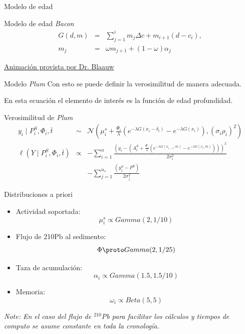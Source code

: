 \documentclass{beamer}
\begin{document}
\begin{frame}{Modelo de edad}
	\begin{block}{Modelo de edad \textit{Bacon} }
 		\begin{eqnarray}
			G(d,m) &=& \sum_{j=1}^i m_j \Delta c  + m_{i+1} (d-c_i)   , \nonumber \\
			m_j &=& \omega m_{j+1}+(1-\omega)\alpha_j \nonumber
		\end{eqnarray}
	\end{block} 
	\href{https://chrono.qub.ac.uk/blaauw/wiggles/Bayes.gif}{Animación provista por Dr. Blaauw}
\end{frame} 

\begin{frame}{Modelo \textit{Plum}}
	Con esto se puede definir la verosimilitud de manera adecuada.

	En esta ecuación el elemento de interés es la función de edad profundidad.
	\begin{block}{ Verosimilitud de \textit{Plum}}
 		\begin{eqnarray}
			y_i\mid P^S_i, \Phi_i, \bar{t} &\sim& \mathcal{N} \left(\mu^s_i+\frac{\Phi_i}{\lambda} \left( e^{-\lambda G(x_i-\delta_i)} - e^{-\lambda G(x_i)} \right), (\sigma_i\rho_i)^2 \right) \nonumber \\
			\ell(Y \mid P^S_i, \Phi_i, \bar{t}  ) &\propto&  -\sum_{i=1}^n \frac{\left(y_i-\left(A_i^S+ \frac{\Phi_i}{\lambda}\left( e^{-\lambda G(x_{i-1},m)} - e^{-\lambda G(x_{i},m)}\right) \right)\right)^2}{2\sigma_i^2} \nonumber \\
			& & - \sum_{j=1}^{n_s} \frac{(y_j^S-P^S)}{2\sigma_j^2} \nonumber
		\end{eqnarray}
	\end{block} 
	\end{frame} 



\begin{frame}{Distribuciones a priori }	
	\begin{block}{ }
 		\begin{itemize}
			\item{Actividad soportada: $$\mu_i^s \propto Gamma(2,1/10)$$ }
			\item{Flujo de 210Pb al sedimento:  $$\Phi\proto Gamma(2,1/25)$$}
			\item{Taza de acumulación: $$\alpha_i \propto Gamma(1.5,1.5/10)$$ }
			\item{Memoria: $$\omega_i \propto Beta(5,5)$$}
		\end{itemize}
	\end{block} 
	\textit{Note: En el caso del flujo de $^{210}$Pb para facilitar los cálculos y tiempos de computo se asume constante en toda la cronología. }
\end{frame} 
\end{document}
